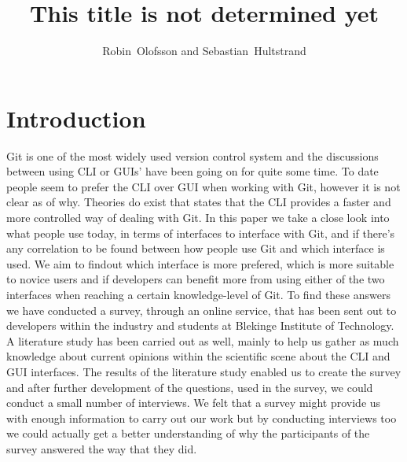 \documentclass[12pt,a4paper,article,compsoc]{IEEEtran}
\begin{document}
	\title{This title is not determined yet}
	\author{Robin~Olofsson and Sebastian~Hultstrand}
	
		
		\maketitle
		
		\section{Introduction}
		Git is one of the most widely used version control system and the discussions between using CLI or GUIs' have been going on for quite some time.
		To date people seem to prefer the CLI over GUI when working with Git, however it is not clear as of why.
		Theories do exist that states that the CLI provides a faster and more controlled way of dealing with Git. \cite{GitUserSurvey}\cite{GitInClassroom}
		In this paper we take a close look into what people use today, in terms of interfaces to interface with Git, and if there's any correlation to be found between how people use Git and which interface is used.
		We aim to findout which interface is more prefered, which is more suitable to novice users and if developers can benefit more from using either of the two interfaces when reaching a certain knowledge-level of Git.
		To find these answers we have conducted a survey, through an online service, that has been sent out to developers within the industry and students at Blekinge Institute of Technology.
		A literature study has been carried out as well, mainly to help us gather as much knowledge about current opinions within the scientific scene about the CLI and GUI interfaces.
		The results of the literature study enabled us to create the survey and after further development of the questions, used in the survey, we could conduct a small number of interviews.
		We felt that a survey might provide us with enough information to carry out our work but by conducting interviews too we could actually get a better understanding of why the participants of the survey answered the way that they did.
		
\end{document}
